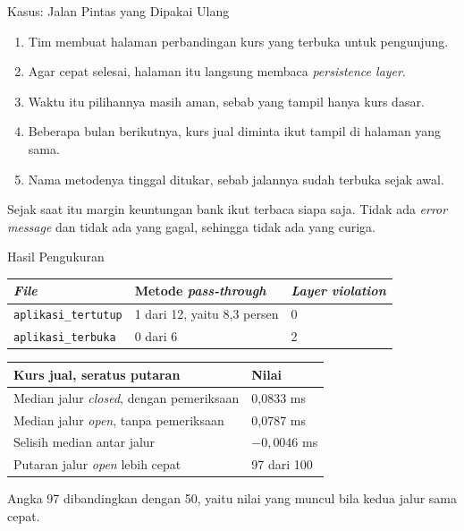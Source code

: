 \documentclass[aspectratio=169, table, 12pt]{beamer}
\begin{document}
\begin{frame}{{\Large Kasus: Jalan Pintas yang Dipakai Ulang}}
  \vspace{8pt}
  \begin{enumerate}
    \item Tim membuat halaman perbandingan kurs yang terbuka untuk pengunjung.
    \item Agar cepat selesai, halaman itu langsung membaca \textit{persistence layer}.
    \item Waktu itu pilihannya masih aman, sebab yang tampil hanya kurs
          dasar.
    \item Beberapa bulan berikutnya, kurs jual diminta ikut tampil di halaman
          yang sama.
    \item Nama metodenya tinggal ditukar, sebab jalannya sudah terbuka sejak
          awal.
  \end{enumerate}

  \vspace{8pt}
  {\small Sejak saat itu margin keuntungan bank ikut terbaca siapa saja. Tidak
  ada \textit{error message} dan tidak ada yang gagal, sehingga tidak ada yang curiga.}
\end{frame}

\begin{frame}{{\Large Hasil Pengukuran}}
  \vspace{8pt}
  \centering
  \small
  \begin{tabularx}{0.92\textwidth}{|X|l|l|}
    \hline
    \textbf{\textit{File}} & \textbf{Metode \textit{pass-through}} & \textbf{\textit{Layer violation}} \\
    \hline
    \texttt{aplikasi\_tertutup} & 1 dari 12, yaitu 8,3 persen & 0 \\
    \hline
    \texttt{aplikasi\_terbuka} & 0 dari 6 & 2 \\
    \hline
  \end{tabularx}

  \vspace{10pt}
  \begin{tabularx}{0.92\textwidth}{|X|l|}
    \hline
    \textbf{Kurs jual, seratus putaran} & \textbf{Nilai} \\
    \hline
    Median jalur \textit{closed}, dengan pemeriksaan & 0,0833 ms \\
    \hline
    Median jalur \textit{open}, tanpa pemeriksaan & 0,0787 ms \\
    \hline
    Selisih median antar jalur & $-0,0046$ ms \\
    \hline
    Putaran jalur \textit{open} lebih cepat & 97 dari 100 \\
    \hline
  \end{tabularx}

  \vspace{6pt}
  {\small Angka 97 dibandingkan dengan 50, yaitu nilai yang muncul bila kedua
  jalur sama cepat.}
\end{frame}
\end{document}
